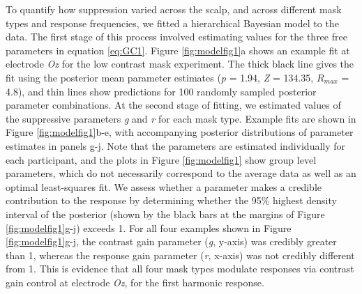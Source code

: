 \documentclass[]{article}
\begin{document}
To quantify how suppression varied across the scalp, and across different mask types and response frequencies, we fitted a hierarchical Bayesian model to the data. The first stage of this process involved estimating values for the three free parameters in equation \eqref{eq:GC1}. Figure \ref{fig:modelfig1}a shows an example fit at electrode \emph{Oz} for the low contrast mask experiment. The thick black line gives the fit using the posterior mean parameter estimates (\emph{p} = 1.94, \emph{Z} = 134.35, \(R_{max}\) = 4.8), and thin lines show predictions for 100 randomly sampled posterior parameter combinations. At the second stage of fitting, we estimated values of the suppressive parameters \emph{g} and \emph{r} for each mask type. Example fits are shown in Figure \ref{fig:modelfig1}b-e, with accompanying posterior distributions of parameter estimates in panels g-j. Note that the parameters are estimated individually for each participant, and the plots in Figure \ref{fig:modelfig1} show group level parameters, which do not necessarily correspond to the average data as well as an optimal least-squares fit. We assess whether a parameter makes a credible contribution to the response by determining whether the 95\% highest density interval of the posterior (shown by the black bars at the margins of Figure \ref{fig:modelfig1}g-j) exceeds 1. For all four examples shown in Figure \ref{fig:modelfig1}g-j, the contrast gain parameter (\emph{g}, y-axis) was credibly greater than 1, whereas the response gain parameter (\emph{r}, x-axis) was not credibly different from 1. This is evidence that all four mask types modulate responses via contrast gain control at electrode \emph{Oz}, for the first harmonic response.
\end{document}
